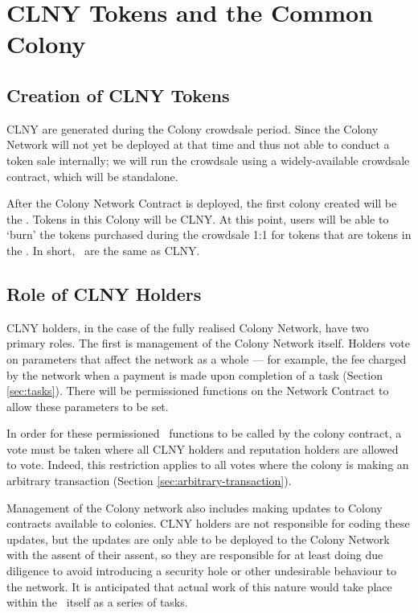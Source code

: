 \section{CLNY Tokens and the Common Colony}\label{sec:clny}

\subsection{Creation of CLNY Tokens}
CLNY are generated during the Colony crowdsale period. Since the Colony Network will not yet be deployed at that time and thus not able to conduct a token sale internally; we will run the crowdsale using a widely-available crowdsale contract, which will be standalone.

After the Colony Network Contract is deployed, the first colony created will be the \rc. Tokens in this Colony will be CLNY. At this point, users will be able to `burn' the tokens purchased during the crowdsale 1:1 for tokens that are tokens in the \rc. In short, \rcts\ are the same as CLNY.

\subsection{Role of CLNY Holders}
CLNY holders, in the case of the fully realised Colony Network, have two primary roles. The first is management of the Colony Network itself. Holders vote on parameters that affect the network as a whole --- for example, the fee charged by the network when a payment is made upon completion of a task (Section \ref{sec:tasks}). There will be permissioned functions on the Network Contract to allow these parameters to be set. 

In order for these permissioned \rc\ functions to be called by the colony contract, a vote must be taken where all CLNY holders and reputation holders are allowed to vote. Indeed, this restriction applies to all votes where the colony is making an arbitrary transaction (Section \ref{sec:arbitrary-transaction}).

Management of the Colony network also includes making updates to Colony contracts available to colonies. CLNY holders are not responsible for coding these updates, but the updates are only able to be deployed to the Colony Network with the assent of their assent, so they are responsible for at least doing due diligence to avoid introducing a security hole or other undesirable behaviour to the network. It is anticipated that actual work of this nature would take place within the \rc\ itself as a series of tasks.

